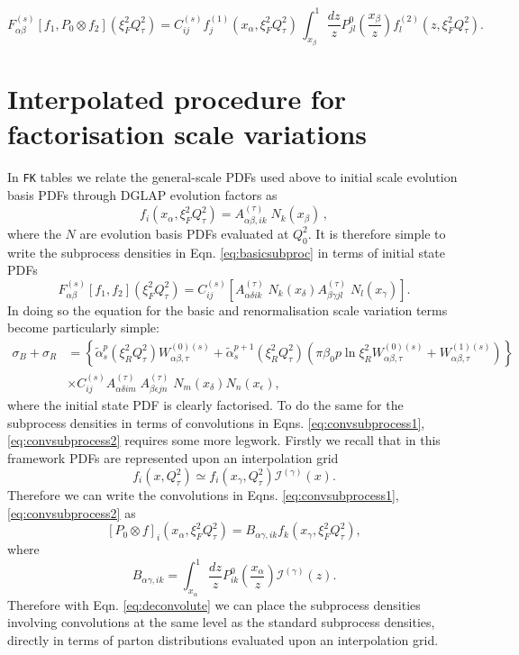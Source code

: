 \documentclass[11pt]{article}
\newcommand{\be}{\begin{equation}}
\newcommand{\ee}{\end{equation}}
\begin{document}
\be \label{eq:convsubprocess2} F^{(s)}_{\alpha\beta}[f_1, P_0\otimes f_2](\xi_F^2{Q^2_\tau})= C^{(s)}_{ij} 
 f_j^{(1)}(x_{\alpha},\xi_F^2Q^2_\tau)\,  \int_{x_\beta}^1 \frac{dz}{z}P^0_{jl}\left(\frac{x_\beta}{z}\right)f^{(2)}_l(z,\xi_F^2Q^2_\tau). \ee
\section{Interpolated procedure for factorisation scale variations}
In {\tt FK} tables we relate the general-scale PDFs used above to initial scale evolution basis PDFs through DGLAP evolution factors as
\begin{equation}\label{eq:fastPDFfinal_recalled}
  f_i(x_{\alpha},\xi_F^2Q^2_\tau) =
  A^{(\tau)}_{\alpha\beta, ik}\;
  N_k(x_\beta)\,, 
\end{equation}
where the $N$ are evolution basis PDFs evaluated at $Q_0^2$. It is therefore simple to write the subprocess densities in Eqn. \ref{eq:basicsubproc} in terms of initial state PDFs
\be
F^{(s)}_{\alpha\beta}[f_1, f_2](\xi_F^2Q^2_\tau) =  \displaystyle
                               C^{(s)}_{ij}
                               \left[  A^{(\tau)}_{\alpha\delta ik}\;
                               N_k(x_\delta) A^{(\tau)}_{\beta\gamma
                               jl}\; N_l(x_\gamma) \right].
 \label{eq:FK1}
\ee
In doing so the equation for the basic and renormalisation scale variation terms become particularly simple:
 \begin{align}
 \sigma_B + \sigma_R &=  \left\{  \tilde{\alpha}_s^{p}(\xi_R^2Q^2_\tau)W_{\alpha\beta,\tau}^{(0)(s)} + \tilde{\alpha}_s^{p+1}(\xi_R^2Q^2_\tau) 
      \left( \pi  \beta_0 p \ln \xi_R^2 W_{\alpha\beta,\tau}^{(0)(s)} + W_{\alpha\beta,\tau}^{(1)(s)} \right) \right\} \nonumber \\
     &  
     \times C^{(s)}_{ij}
                A^{(\tau)}_{\alpha\delta im}\;
                A^{(\tau)}_{\beta\epsilon jn}\;  N_m(x_\delta)N_n(x_\epsilon), 
\end{align}
where the initial state PDF is clearly factorised.
To do the same for the subprocess densities in terms of convolutions in Eqns. \ref{eq:convsubprocess1}, \ref{eq:convsubprocess2} requires some more legwork.
Firstly we recall that in this framework PDFs are represented upon an interpolation grid
\be f_i(x,Q_\tau^2) \simeq f_i(x_\gamma, Q_\tau^2)\mathcal{I}^{(\gamma)}(x).\ee
Therefore we can write the convolutions in Eqns. \ref{eq:convsubprocess1}, \ref{eq:convsubprocess2} as
\be \label{eq:deconvolute} \left[P_0\otimes f\right]_{i}(x_\alpha,  \xi_F^2Q_\tau^2) =  B_{\alpha\gamma, ik} f_k(x_\gamma, \xi_F^2Q_\tau^2),\ee
where
\be B_{\alpha\gamma, ik} = \int_{x_\alpha}^1 \frac{dz}{z} P_{ik}^0\left(\frac{x_\alpha}{z}\right)\mathcal{I}^{(\gamma)}(z).\ee
Therefore with Eqn. \ref{eq:deconvolute} we can place the subprocess densities involving convolutions at the same level as the standard subprocess densities, directly in terms of parton distributions evaluated upon an interpolation grid.
\end{document}
